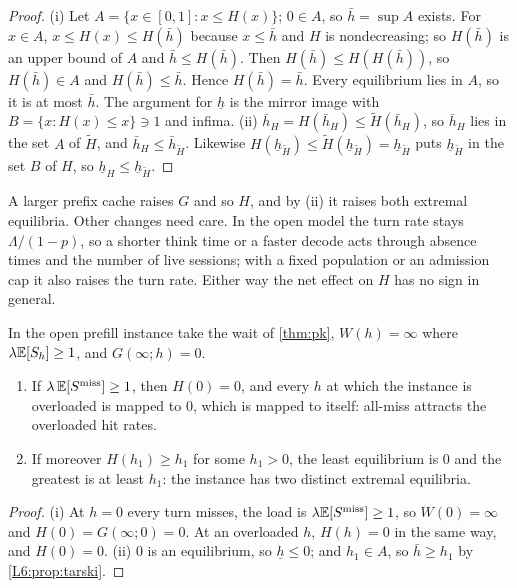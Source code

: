 \begin{proof}
(i) Let $A=\{x\in[0,1]:x\le H(x)\}$; $0\in A$, so $\bar h=\sup A$ exists. For $x\in A$,
$x\le H(x)\le H(\bar h)$ because $x\le\bar h$ and $H$ is nondecreasing; so $H(\bar h)$ is
an upper bound of $A$ and $\bar h\le H(\bar h)$. Then $H(\bar h)\le H(H(\bar h))$, so
$H(\bar h)\in A$ and $H(\bar h)\le\bar h$. Hence $H(\bar h)=\bar h$. Every equilibrium lies
in $A$, so it is at most $\bar h$. The argument for $\underline h$ is the mirror image
with $B=\{x:H(x)\le x\}\ni1$ and infima.
(ii) $\bar h_H=H(\bar h_H)\le\tilde H(\bar h_H)$, so $\bar h_H$ lies in the set $A$ of $\tilde H$, and
$\bar h_H\le\bar h_{\tilde H}$. Likewise $H(\underline h_{\tilde H})\le\tilde H(\underline h_{\tilde H})=\underline h_{\tilde H}$
puts $\underline h_{\tilde H}$ in the set $B$ of $H$, so $\underline h_H\le\underline h_{\tilde H}$.
\end{proof}

A larger prefix cache raises $G$ and so $H$, and by (ii) it raises both extremal
equilibria. Other changes need care. In the open model the turn rate stays $\Lambda/(1-p)$, so a
shorter think time or a faster decode acts through absence times and the number of
live sessions; with a fixed population or an admission cap it also raises the turn
rate. Either way the net effect on $H$ has no sign in general.

\begin{proposition}[Collapse]\label{L6:prop:collapse}
In the open prefill instance take the wait of \cref{thm:pk}, $W(h)=\infty$ where
$\lambda\mathbb{E}[S_h]\ge1$, and $G(\infty;h)=0$.
\begin{enumerate}[label=(\roman*)]
\item If $\lambda\,\mathbb{E}[S^{\mathrm{miss}}]\ge1$, then $H(0)=0$, and every $h$ at which the
  instance is overloaded is mapped to 0, which is mapped to itself: all-miss attracts
  the overloaded hit rates.
\item If moreover $H(h_1)\ge h_1$ for some $h_1>0$, the least equilibrium is 0 and the
  greatest is at least $h_1$: the instance has two distinct extremal equilibria.
\end{enumerate}
\end{proposition}

\begin{proof}
(i) At $h=0$ every turn misses, the load is $\lambda\mathbb{E}[S^{\mathrm{miss}}]\ge1$, so
$W(0)=\infty$ and $H(0)=G(\infty;0)=0$. At an overloaded $h$, $H(h)=0$ in the same way,
and $H(0)=0$. (ii) 0 is an equilibrium, so $\underline h\le0$; and $h_1\in A$, so
$\bar h\ge h_1$ by \cref{L6:prop:tarski}.
\end{proof}

